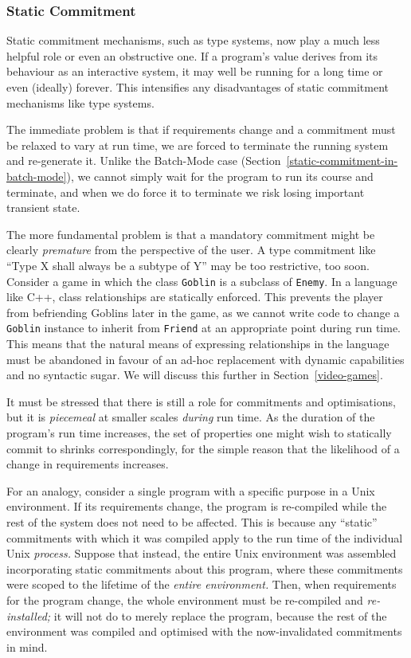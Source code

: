 \documentclass[ twoside,openright,titlepage,numbers=noenddot,headinclude,footinclude,cleardoublepage=empty,abstract=on,
                BCOR=5mm,paper=a4,fontsize=11pt
                ]{scrreprt}
\theoremstyle{definition}
\begin{document}
\hypertarget{static-commitment}{\subsubsection{Static Commitment}\label{static-commitment}}

Static commitment mechanisms, such as type systems, now play a much less
helpful role or even an obstructive one. If a program's value derives
from its behaviour as an interactive system, it may well be running for
a long time or even (ideally) forever. This intensifies any
disadvantages of static commitment mechanisms like type systems.

The immediate problem is that if requirements change and a commitment
must be relaxed to vary at run time, we are forced to terminate the
running system and re-generate it. Unlike the Batch-Mode case
(Section~\ref{static-commitment-in-batch-mode}), we cannot simply wait
for the program to run its course and terminate, and when we do force it
to terminate we risk losing important transient state.

The more fundamental problem is that a mandatory commitment might be
clearly \emph{premature} from the perspective of the user. A type
commitment like ``Type X shall always be a subtype of Y'' may be too
restrictive, too soon. Consider a game in which the class
\texttt{Goblin} is a subclass of \texttt{Enemy}. In a language like C++,
class relationships are statically enforced. This prevents the player
from befriending Goblins later in the game, as we cannot write code to
change a \texttt{Goblin} instance to inherit from \texttt{Friend} at an
appropriate point during run time. This means that the natural means of
expressing relationships in the language must be abandoned in favour of
an ad-hoc replacement with dynamic capabilities and no syntactic sugar.
We will discuss this further in Section~\ref{video-games}.

It must be stressed that there is still a role for commitments and
optimisations, but it is \emph{piecemeal} at smaller scales
\emph{during} run time. As the duration of the program's run time
increases, the set of properties one might wish to statically commit to
shrinks correspondingly, for the simple reason that the likelihood of a
change in requirements increases.

For an analogy, consider a single program with a specific purpose in a
Unix environment. If its requirements change, the program is re-compiled
while the rest of the system does not need to be affected. This is
because any ``static'' commitments with which it was compiled apply to
the run time of the individual Unix \emph{process.} Suppose that
instead, the entire Unix environment was assembled incorporating static
commitments about this program, where these commitments were scoped to
the lifetime of the \emph{entire environment.} Then, when requirements
for the program change, the whole environment must be re-compiled and
\emph{re-installed;} it will not do to merely replace the program,
because the rest of the environment was compiled and optimised with the
now-invalidated commitments in mind.
\end{document}
